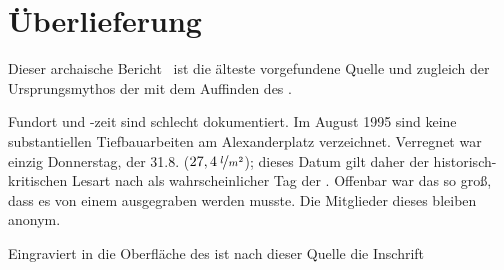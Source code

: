 \section{Überlieferung}%


Dieser archaische Bericht~\cite{cbasefund} ist die älteste vorgefundene Quelle und zugleich der Ur\-sprungs\-my\-thos der  mit dem Auffinden des . 

Fundort und -zeit sind schlecht dokumentiert. Im August 1995 sind keine substantiellen Tiefbauarbeiten am Alexanderplatz verzeichnet. Verregnet war einzig Donnerstag, der 31.8. ($27,4\:\nicefrac{l}{m^2}$); dieses Datum gilt daher der historisch-kritischen Lesart nach als wahrscheinlicher Tag der . Offenbar war das  so groß, dass es von einem  ausgegraben werden musste. Die Mitglieder dieses  bleiben anonym.

Eingraviert in die Oberfläche des  ist nach dieser Quelle die Inschrift 

